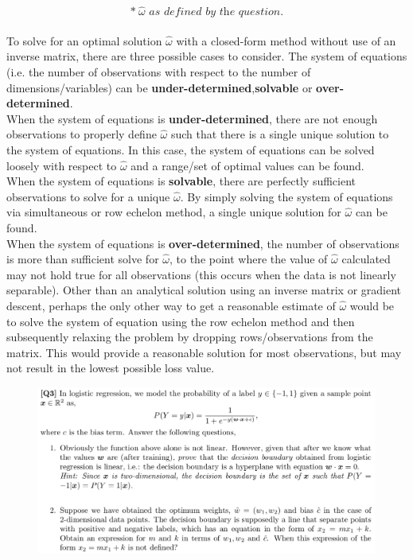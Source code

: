 \documentclass[12pt]{article}
\newenvironment{solution}[2][Solution]{\begin{trivlist}
\item[\hskip \labelsep {\bfseries #1}]}{\end{trivlist}}
\begin{document}
\begin{solution}{}
$$*\ \hat\omega\textit{ as defined by the question.}$$
~\\
To solve for an optimal solution $\hat\omega$ with a closed-form method without use of an inverse matrix, there are three possible cases to consider. The system of equations (i.e. the number of observations with respect to the number of dimensions/variables) can be \textbf{under-determined},\textbf{solvable} or  \textbf{over-determined}.\\

When the system of equations is \textbf{under-determined}, there are not enough observations to properly define $\hat\omega$ such that there is a single unique solution to the system of equations. In this case, the system of equations can be solved loosely with respect to $\hat\omega$ and a range/set of optimal values can be found.\\

When the system of equations is \textbf{solvable}, there are perfectly sufficient observations to solve for a unique $\hat\omega$. By simply solving the system of equations via simultaneous or row echelon method, a single unique solution for $\hat\omega$ can be found.\\

When the system of equations is \textbf{over-determined}, the number of observations is more than sufficient solve for $\hat\omega$, to the point where the value of $\hat\omega$ calculated may not hold true for all observations (this occurs when the data is not linearly separable). Other than an analytical solution using an inverse matrix or gradient descent, perhaps the only other way to get a reasonable estimate of $\hat\omega$ would be to solve the system of equation using the row echelon method and then subsequently relaxing the problem by dropping rows/observations from the matrix. This would provide a reasonable solution for most observations, but may not result in the lowest possible loss value.

\end{solution}

\pagebreak

\begin{figure}[h!]
\includegraphics[width=\linewidth]{./assets/201805292055.png}
\end{figure}
\end{document}
